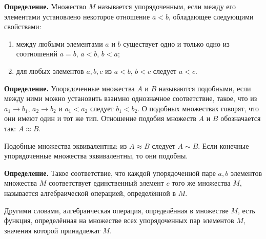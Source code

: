 \begin{rusblock}
\textbf{Определение.} Множество $M$ называется упорядоченным, если между его элементами установлено некоторое отношение $a<b$, обладающее следующими свойствами:
\begin{enumerate}[leftmargin=2.2em]
\item между любыми элементами $a$ и $b$ существует одно и только одно из соотношений $a=b$, $a<b$, $b<a$;
\item для любых элементов $a,b,c$ из $a<b$, $b<c$ следует $a<c$.
\end{enumerate}
\end{rusblock}

\begin{rusblock}
\textbf{Определение.} Упорядоченные множества $A$ и $B$ называются подобными, если между ними можно установить взаимно однозначное соответствие, такое, что из $a_1\to b_1$, $a_2\to b_2$ и $a_1<a_2$ следует $b_1<b_2$. О подобных множествах говорят, что они имеют один и тот же тип. Отношение подобия множеств $A$ и $B$ обозначается так: $A\approx B$.

Подобные множества эквивалентны: из $A\approx B$ следует $A\sim B$. Если конечные упорядоченные множества эквивалентны, то они подобны.
\end{rusblock}

\begin{rusblock}
\textbf{Определение.} Такое соответствие, что каждой упорядоченной паре $a,b$ элементов множества $M$ соответствует единственный элемент $c$ того же множества $M$, называется алгебраической операцией, определённой в $M$.

Другими словами, алгебраическая операция, определённая в множестве $M$, есть функция, определённая на множестве всех упорядоченных пар элементов $M$, значения которой принадлежат $M$.
\end{rusblock}

